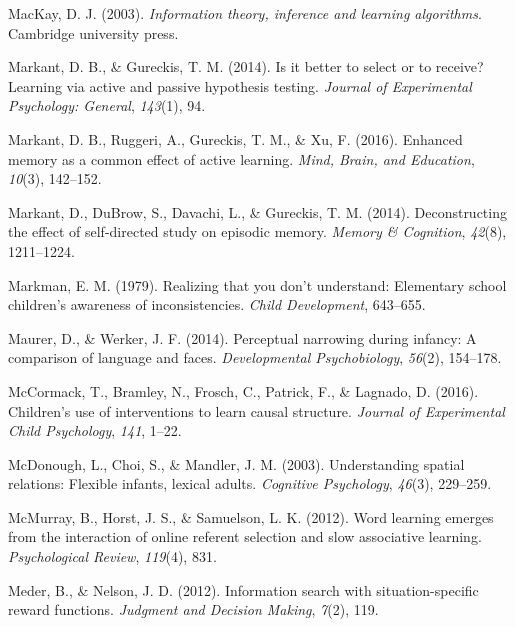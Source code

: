 \documentclass[oneside]{report}
\begin{document}
\leavevmode\hypertarget{ref-mackay2003information}{}%
MacKay, D. J. (2003). \emph{Information theory, inference and learning
algorithms}. Cambridge university press.

\leavevmode\hypertarget{ref-markant2014better}{}%
Markant, D. B., \& Gureckis, T. M. (2014). Is it better to select or to
receive? Learning via active and passive hypothesis testing.
\emph{Journal of Experimental Psychology: General}, \emph{143}(1), 94.

\leavevmode\hypertarget{ref-markant2016enhanced}{}%
Markant, D. B., Ruggeri, A., Gureckis, T. M., \& Xu, F. (2016). Enhanced
memory as a common effect of active learning. \emph{Mind, Brain, and
Education}, \emph{10}(3), 142--152.

\leavevmode\hypertarget{ref-markant2014deconstructing}{}%
Markant, D., DuBrow, S., Davachi, L., \& Gureckis, T. M. (2014).
Deconstructing the effect of self-directed study on episodic memory.
\emph{Memory \& Cognition}, \emph{42}(8), 1211--1224.

\leavevmode\hypertarget{ref-markman1979realizing}{}%
Markman, E. M. (1979). Realizing that you don't understand: Elementary
school children's awareness of inconsistencies. \emph{Child
Development}, 643--655.

\leavevmode\hypertarget{ref-maurer2014perceptual}{}%
Maurer, D., \& Werker, J. F. (2014). Perceptual narrowing during
infancy: A comparison of language and faces. \emph{Developmental
Psychobiology}, \emph{56}(2), 154--178.

\leavevmode\hypertarget{ref-mccormack2016children}{}%
McCormack, T., Bramley, N., Frosch, C., Patrick, F., \& Lagnado, D.
(2016). Children's use of interventions to learn causal structure.
\emph{Journal of Experimental Child Psychology}, \emph{141}, 1--22.

\leavevmode\hypertarget{ref-mcdonough2003understanding}{}%
McDonough, L., Choi, S., \& Mandler, J. M. (2003). Understanding spatial
relations: Flexible infants, lexical adults. \emph{Cognitive
Psychology}, \emph{46}(3), 229--259.

\leavevmode\hypertarget{ref-mcmurray2012word}{}%
McMurray, B., Horst, J. S., \& Samuelson, L. K. (2012). Word learning
emerges from the interaction of online referent selection and slow
associative learning. \emph{Psychological Review}, \emph{119}(4), 831.

\leavevmode\hypertarget{ref-meder2012information}{}%
Meder, B., \& Nelson, J. D. (2012). Information search with
situation-specific reward functions. \emph{Judgment and Decision
Making}, \emph{7}(2), 119.
\end{document}

